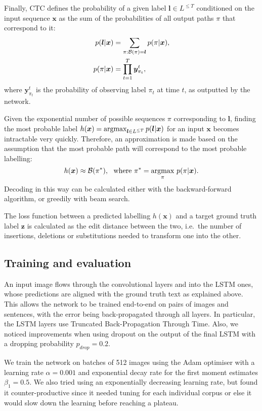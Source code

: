 	 		Finally, CTC defines the probability of a given label \(\bm{l} \in L^{\leq T}\) conditioned on the input sequence \(\mathbf{x}\) as the sum of the probabilities of all output paths \(\pi\) that correspond to it:
	 		\begin{align*}
				p(\bm{l} | \bm{x}) &= \sum_{\pi:{\cal B}(\pi)=\bm{l}}p(\pi|\bm{x}), \\
				p(\pi | \bm{x}) &= \prod_{t=1}^T \bm{y}_{\pi_t}^{t},
				\label{eq:stringprob}
			\end{align*}
			where \(\bm{y}_{\pi_t}^{t}\) is the probability of observing label \(\pi_t\) at time \(t\), as outputted by the network.

			Given the exponential number of possible sequences \(\pi\) corresponding to \(\bm l\), finding the most probable label \(h(\bm{x}) = \operatorname{argmax}_{\bm{l} \in L^{\leq T}} p(\bm{l} | \bm{x})\) for an input \(\bm x\) becomes intractable very quickly. Therefore, an approximation is made based on the assumption that the most probable path will correspond to the most probable labelling:\[
				h(\bm{x}) \approx \mathcal{B}(\pi^*),~~ \text{where } \pi^* = \underset{\pi}{\operatorname{argmax}}~ p(\pi|\bm{x}).
			\] Decoding in this way can be calculated either with the backward-forward algorithm, or greedily with beam search.

			The loss function between a predicted labelling \(h(\bm{x})\) and a target ground truth label \(\bm z\) is calculated as the edit distance between the two, i.e.\ the number of insertions, deletions or substitutions needed to transform one into the other.


	\subsection{Training and evaluation}
		An input image flows through the convolutional layers and into the LSTM ones, whose predictions are aligned with the ground truth text as explained above. This allows the network to be trained end-to-end on pairs of images and sentences, with the error being back-propagated through all layers. In particular, the LSTM layers use Truncated Back-Propagation Through Time. Also, we noticed improvements when using dropout on the output of the final LSTM with a dropping probability \(p_\mathit{drop} = 0.2\).

		We train the network on batches of 512 images using the Adam optimiser \citep{adam} with a learning rate \(\alpha = 0.001\) and exponential decay rate for the first moment estimates \(\beta_1 = 0.5\). We also tried using an exponentially decreasing learning rate, but found it counter-productive since it needed tuning for each individual corpus or else it would slow down the learning before reaching a plateau.

